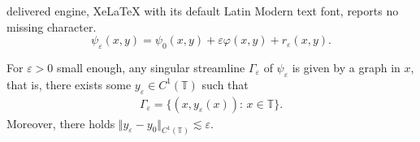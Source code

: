 \documentclass[10pt,a4paper]{amsart}
\newcommand{\ve}{\varepsilon}
\begin{document}
delivered engine, XeLaTeX with its default Latin Modern text font, reports no missing character.
\begin{equation}\label{eq:defPsive}
\psi_\ve(x,y) = {\psi_0}(x,y) + \ve {\varphi}(x,y) + r_\ve(x,y).
\end{equation}

\begin{lemma}\label{lemma:ApproxGammave}
For $\ve>0$ small enough, any singular streamline $\Gamma_\ve$ of $\psi_\ve$ is given by a graph in $x$, that is, there exists some $y_\ve\in C^1(\mathbb{T})$ such that
\begin{align*}
\Gamma_\ve = \lbrace (x,y_\ve(x)): \, x\in \mathbb{T} \rbrace.
\end{align*}
Moreover, there holds $\Vert y_\ve - y_0 \Vert_{C^1(\mathbb{T})}\lesssim \ve$.
\end{lemma}
\end{document}
